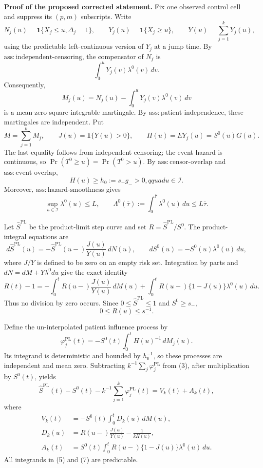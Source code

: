 \textbf{Proof of the proposed corrected statement.}
Fix one observed control cell and suppress its \((p,m)\) subscripts.  Write
\[
 N_j(u)=\mathbf 1\{X_j\le u,\Delta_j=1\},\qquad
 Y_j(u)=\mathbf 1\{X_j\ge u\},\qquad
 Y(u)=\sum_{j=1}^kY_j(u),
\]
using the predictable left-continuous version of \(Y_j\) at a jump time.  By \(\mathrm{ass:independent\mbox{-}censoring}\), the compensator of \(N_j\) is
\[
 \int_0^uY_j(v)\lambda^0(v)\,dv.
\]
Consequently,
\[
 M_j(u)=N_j(u)-\int_0^uY_j(v)\lambda^0(v)\,dv
\]
is a mean-zero square-integrable martingale.  By \(\mathrm{ass:patient\mbox{-}independence}\), these martingales are independent.  Put
\[
 M=\sum_{j=1}^kM_j,\qquad
 J(u)=\mathbf 1\{Y(u)>0\},\qquad
 H(u)=E Y_j(u)=S^0(u)G(u).
\]
The last equality follows from independent censoring; the event hazard is continuous, so \(\Pr(T^0\ge u)=\Pr(T^0>u)\).  By \(\mathrm{ass:censor\mbox{-}overlap}\) and \(\mathrm{ass:event\mbox{-}overlap}\),
\[
 H(u)\ge h_0:=s_-g_->0,qquad u\in\mathcal I.                 \tag{1}
\]
Moreover, \(\mathrm{ass:hazard\mbox{-}smoothness}\) gives
\[
 \sup_{u\in\mathcal I}\lambda^0(u)\le L,
 \qquad
 \Lambda^0(\bar\tau):=\int_0^{\bar\tau}\lambda^0(u)\,du
 \le L\bar\tau.                                               \tag{2}
\]

Let \(\widehat S^{\mathrm{PL}}\) be the product-limit step curve and set \(R=\widehat S^{\mathrm{PL}}/S^0\).  The product-integral equations are
\[
 d\widehat S^{\mathrm{PL}}(u)
 =-\widehat S^{\mathrm{PL}}(u-)\frac{J(u)}{Y(u)}\,dN(u),
 \qquad
 dS^0(u)=-S^0(u)\lambda^0(u)\,du,
\]
where \(J/Y\) is defined to be zero on an empty risk set.  Integration by parts and \(dN=dM+Y\lambda^0du\) give the exact identity
\[
 R(t)-1
 =-\int_0^tR(u-)\frac{J(u)}{Y(u)}\,dM(u)
  +\int_0^tR(u-)\{1-J(u)\}\lambda^0(u)\,du.                 \tag{3}
\]
Thus no division by zero occurs.  Since \(0\le\widehat S^{\mathrm{PL}}\le1\) and \(S^0\ge s_-\),
\[
 0\le R(u)\le s_-^{-1}.                                      \tag{4}
\]

Define the un-interpolated patient influence process by
\[
 \varphi_j^{\mathrm{PL}}(t)
 =-S^0(t)\int_0^tH(u)^{-1}\,dM_j(u).                         \tag{5}
\]
Its integrand is deterministic and bounded by \(h_0^{-1}\), so these processes are independent and mean zero.  Subtracting \(k^{-1}\sum_j\varphi_j^{\mathrm{PL}}\) from (3), after multiplication by \(S^0(t)\), yields
\[
 \widehat S^{\mathrm{PL}}(t)-S^0(t)
 -k^{-1}\sum_{j=1}^k\varphi_j^{\mathrm{PL}}(t)
 =V_k(t)+A_k(t),                                               \tag{6}
\]
where
\[
 \begin{aligned}
 V_k(t)&=-S^0(t)\int_0^tD_k(u)\,dM(u),\\
 D_k(u)&=R(u-)\frac{J(u)}{Y(u)}-\frac{1}{kH(u)},\\
 A_k(t)&=S^0(t)\int_0^tR(u-)\{1-J(u)\}\lambda^0(u)\,du.
 \end{aligned}                                                 \tag{7}
\]
All integrands in (5) and (7) are predictable.

